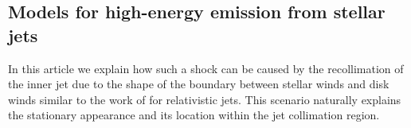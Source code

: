 \subsection{Models for high-energy emission from stellar jets}
\label{sect:intromodel}
In this article we explain how such a shock can be caused by the recollimation of the inner jet due to the shape of the boundary between stellar winds and disk winds similar to the work of \citet{2012MNRAS.422.2282K} for relativistic jets. This scenario naturally explains the stationary appearance and its location within the jet collimation region.